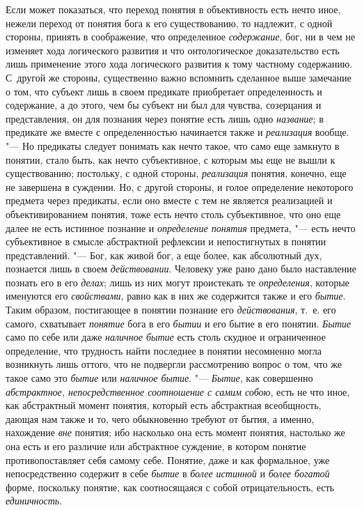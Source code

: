 {{Если может показаться, что переход понятия в объективность
есть нечто иное, нежели переход от понятия бога к его существованию, то
надлежит, с одной стороны, принять в соображение, что определенное
{\em содержание}, бог, ни
в чем не изменяет хода логического развития и что онтологическое
доказательство есть лишь применение этого хода логического развития к тому
частному содержанию. С~другой же стороны, существенно важно вспомнить
сделанное выше замечание о том, что субъект лишь в своем предикате
приобретает определенность и содержание, а до этого, чем бы субъект ни был
для чувства, созерцания и представления, он для познания через понятие есть
лишь одно {\em название};
в предикате же вместе с определенностью начинается также и
{\em реализация} вообще.
"--- Но предикаты следует понимать как нечто такое, что само еще
замкнуто в понятии, стало быть, как нечто субъективное, с которым мы еще не
вышли к существованию; постольку, с одной стороны,
{\em реализация} понятия,
конечно, еще не завершена в суждении. Но, с другой стороны, и голое
определение некоторого предмета через предикаты, если оно вместе с тем не
является реализацией и объективированием понятия, тоже есть нечто столь
субъективное, что оно еще далее не есть истинное познание и
{\em определение понятия}
предмета, "--- есть нечто субъективное в смысле
абстрактной рефлексии и непостигнутых в понятии представлений. "---
Бог, как живой бог, а еще более, как абсолютный дух,
познается лишь в своем {\em действовании}.
Человеку уже рано дано было наставление познать его в его
{\em делах}; лишь из них могут проистекать те {\em определения},
которые именуются его {\em свойствами}, равно
как в них же содержится также и его {\em бытие}. Таким
образом, постигающее в понятии познание его {\em действования}, т.~е.
его самого, схватывает {\em понятие} бога в его {\em бытии}
и его бытие в его понятии. {\em Бытие} само по себе
или даже {\em наличное бытие}
есть столь скудное и ограниченное определение, что трудность
найти последнее в понятии несомненно могла возникнуть лишь оттого, что не
подвергли рассмотрению вопрос о том, что же такое само это
{\em бытие} или {\em наличное бытие}. "--- {\em Бытие}, как
совершенно {\em абстрактное,
непосредственное соотношение с самим собою}, есть не что
иное, как абстрактный момент понятия, который есть
абстрактная всеобщность, дающая нам также и то, чего обыкновенно требуют от
бытия, а именно, нахождение {\em вне}
понятия; ибо насколько она есть момент понятия, настолько же
она есть и его различие или абстрактное суждение, в котором понятие
противопоставляет себя самому себе. Понятие, даже и как формальное, уже
непосредственно содержит в себе
{\em бытие} в {\em более истинной} и {\em более богатой}
форме, поскольку понятие, как соотносящаяся с собой
отрицательность, есть {\em единичность}.

}}
